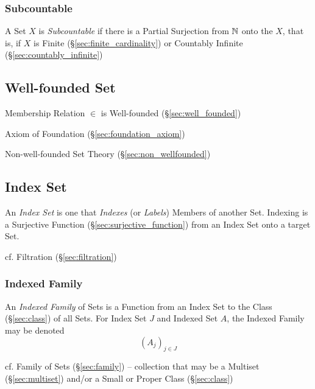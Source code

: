 \subsubsection{Subcountable}\label{sec:subcountable}

A Set $X$ is \emph{Subcountable} if there is a Partial Surjection from
$\mathbb{N}$ onto the $X$, that is, if $X$ is Finite
(\S\ref{sec:finite_cardinality}) or Countably Infinite
(\S\ref{sec:countably_infinite})



\subsection{Well-founded Set}\label{sec:wellfounded_set}

Membership Relation $\in$ is Well-founded (\S\ref{sec:well_founded})

Axiom of Foundation (\S\ref{sec:foundation_axiom})

Non-well-founded Set Theory (\S\ref{sec:non_wellfounded})



\subsection{Index Set}\label{sec:index_set}

An \emph{Index Set} is one that \emph{Indexes} (or \emph{Labels})
Members of another Set. Indexing is a Surjective Function
(\S\ref{sec:surjective_function}) from an Index Set onto a target Set.

\fist cf. Filtration (\S\ref{sec:filtration})



\subsubsection{Indexed Family}\label{sec:indexed_family}

An \emph{Indexed Family} of Sets is a Function from an Index Set to the Class
(\S\ref{sec:class}) of all Sets. For Index Set $J$ and Indexed Set $A$, the
Indexed Family may be denoted
\[
  (A_j)_{j \in J}
\]

\fist cf. Family of Sets (\S\ref{sec:family}) -- collection that may be a
Multiset (\S\ref{sec:multiset}) and/or a Small or Proper Class
(\S\ref{sec:class})



